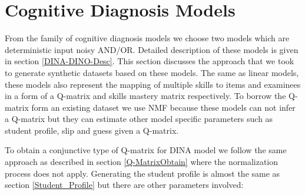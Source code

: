 








\section{Cognitive Diagnosis Models}

From the family of cognitive diagnosis models we choose two models which are deterministic input noisy AND/OR. Detailed description of these models is given in section \ref{DINA-DINO-Desc}. This section discusses the approach that we took to generate synthetic datasets based on these models. The same as linear models, these models also represent the mapping of multiple skills to items and examinees in a form of a Q-matrix and skills mastery matrix respectively. To borrow the Q-matrix form an existing dataset we use NMF because these models can not infer a Q-matrix but they can estimate other model specific parameters such as student profile, slip and guess given a Q-matrix. 


To obtain a conjunctive type of Q-matrix for DINA model we follow the same approach as described in section \ref{Q-MatrixObtain} where the normalization process does not apply.  Generating the student profile is almost the same as section \ref{Student_Profile} but there are other parameters involved:

